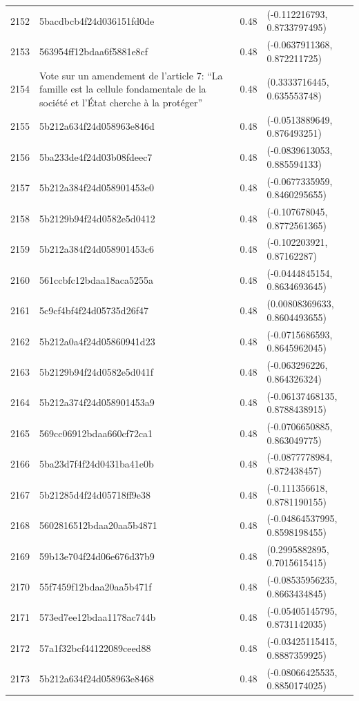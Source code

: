 \begin{table}[ht]
\begin{tabular}{rlrl}
  2152 & 5bacdbcb4f24d036151fd0de & 0.48 & (-0.112216793, 0.8733797495) \\ 
  2153 & 563954ff12bdaa6f5881e8cf & 0.48 & (-0.0637911368, 0.872211725) \\ 
  2154 & Vote sur un amendement de l'article 7: “La famille est la cellule fondamentale de la société et l’État cherche à la protéger” & 0.48 & (0.3333716445, 0.635553748) \\ 
  2155 & 5b212a634f24d058963e846d & 0.48 & (-0.0513889649, 0.876493251) \\ 
  2156 & 5ba233de4f24d03b08fdeec7 & 0.48 & (-0.0839613053, 0.885594133) \\ 
  2157 & 5b212a384f24d058901453e0 & 0.48 & (-0.0677335959, 0.8460295655) \\ 
  2158 & 5b2129b94f24d0582e5d0412 & 0.48 & (-0.107678045, 0.8772561365) \\ 
  2159 & 5b212a384f24d058901453c6 & 0.48 & (-0.102203921, 0.87162287) \\ 
  2160 & 561ccbfc12bdaa18aca5255a & 0.48 & (-0.0444845154, 0.8634693645) \\ 
  2161 & 5c9cf4bf4f24d05735d26f47 & 0.48 & (0.00808369633, 0.8604493655) \\ 
  2162 & 5b212a0a4f24d05860941d23 & 0.48 & (-0.0715686593, 0.8645962045) \\ 
  2163 & 5b2129b94f24d0582e5d041f & 0.48 & (-0.063296226, 0.864326324) \\ 
  2164 & 5b212a374f24d058901453a9 & 0.48 & (-0.06137468135, 0.8788438915) \\ 
  2165 & 569cc06912bdaa660cf72ca1 & 0.48 & (-0.0706650885, 0.863049775) \\ 
  2166 & 5ba23d7f4f24d0431ba41e0b & 0.48 & (-0.0877778984, 0.872438457) \\ 
  2167 & 5b21285d4f24d05718ff9e38 & 0.48 & (-0.111356618, 0.8781190155) \\ 
  2168 & 5602816512bdaa20aa5b4871 & 0.48 & (-0.04864537995, 0.8598198455) \\ 
  2169 & 59b13e704f24d06e676d37b9 & 0.48 & (0.2995882895, 0.7015615415) \\ 
  2170 & 55f7459f12bdaa20aa5b471f & 0.48 & (-0.08535956235, 0.8663434845) \\ 
  2171 & 573ed7ee12bdaa1178ac744b & 0.48 & (-0.05405145795, 0.8731142035) \\ 
  2172 & 57a1f32bcf44122089ceed88 & 0.48 & (-0.03425115415, 0.8887359925) \\ 
  2173 & 5b212a634f24d058963e8468 & 0.48 & (-0.08066425535, 0.8850174025) \\ 

\end{tabular}
\end{table}
